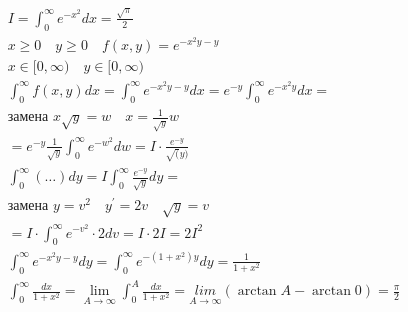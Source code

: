 \documentclass[main]{subfiles}
\begin{document}
     \begin{example}
          \begin{gather*}
               I = \int^\infty_0 e^{-x^2} dx = \frac{\sqrt{\pi}}{2} \\
               x \geq 0 \quad y \geq 0 \quad f(x,y) = e^{-x^2y - y} \tag{1} \\
               x \in [0, \infty) \quad y \in [0, \infty) \\
                \int^\infty_0 f(x,y) dx = \int^\infty_0 e^{-x^2y - y} dx = 
               e^{-y} \int^\infty_0 e^{-x^2y} dx = \\
               \text{замена } x\sqrt{y} = w \quad x = \frac{1}{\sqrt{y}}w \\
                = e^{-y} \frac{1}{\sqrt{y}} \int^\infty_0 e^{-w^2} dw = I \cdot \frac {e^{-y}}{\sqrt(y)} \tag{2} \\
               \int^\infty_0 (\ldots)dy = I \int^\infty_0 \frac{e^{-y}}{\sqrt{y}}dy = \\
               \text{замена } y = v^2 \quad y^\prime = 2v \quad \sqrt{y} = v \\
                =I \cdot \int^\infty_0 e^{-v^2} \cdot 2dv = I \cdot 2I = 2I^2 \tag{3} \\
                \int^\infty_0 e^{-x^2y -y}dy = \int^\infty_0 e^{-(1+x^2)y} dy = \frac{1}{1+x^2} \tag{4} \\
                 \int^\infty_0 \frac{dx}{1+x^2} = \underset{A \to \infty}{\lim} \int^A_0 \frac{dx}{1+x^2} = \underset{A \to \infty}{lim} (\arctan A - \arctan 0) = \frac{\pi}{2} \tag{5}
          \end{gather*}
     \end{example}
    
\end{document}
